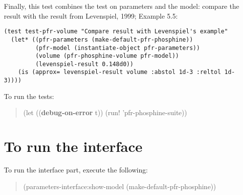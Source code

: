\documentclass[listings, a4paper, fleqn, pdftex, 12pt, openany, oneside, final]{memoir}
\theoremstyle{definition}
\begin{document}
Finally, this test combines the test on parameters and the model:
compare the result with the result from Levenspiel, 1999; Example 5.5:
\begin{verbatim}
(test test-pfr-volume "Compare result with Levenspiel's example"
  (let* ((pfr-parameters (make-default-pfr-phosphine))
         (pfr-model (instantiate-object pfr-parameters))
         (volume (pfr-phosphine-volume pfr-model))
         (levenspiel-result 0.148d0))
    (is (approx= levenspiel-result volume :abstol 1d-3 :reltol 1d-3))))
\end{verbatim}

To run the tests:
\begin{quote}
(let ((\textbf{debug-on-error} t))
  (run! 'pfr-phosphine-suite))
\end{quote}

\section{To run the interface}
\label{sec:orgheadline8}
To run the interface part, execute the following:
\begin{quote}
(parameters-interface:show-model (make-default-pfr-phosphine))
\end{quote}
\end{document}
